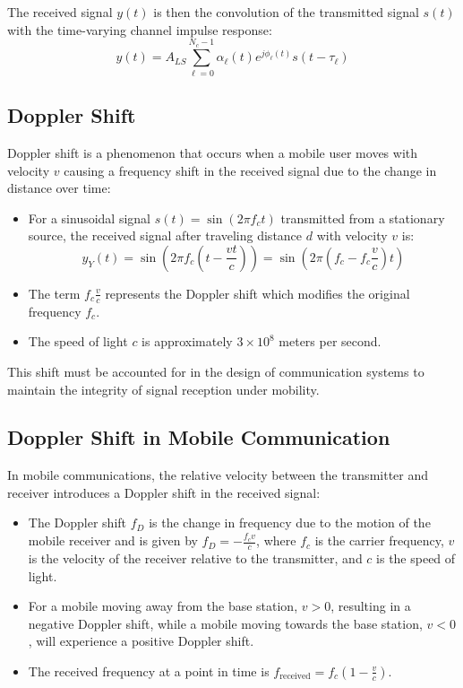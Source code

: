 The received signal \( y(t) \) is then the convolution of the transmitted signal \( s(t) \) with the time-varying channel impulse response:
\begin{equation}
    y(t) = A_{LS} \sum_{\ell=0}^{N_c-1} \alpha_{\ell}(t) e^{j\phi_{\ell}(t)} s(t - \tau_{\ell})
\end{equation}

\subsection*{Doppler Shift}

Doppler shift is a phenomenon that occurs when a mobile user moves with velocity \( v \) causing a frequency shift in the received signal due to the change in distance over time:

\begin{itemize}
    \item For a sinusoidal signal \( s(t) = \sin(2\pi f_c t) \) transmitted from a stationary source, the received signal after traveling distance \( d \) with velocity \( v \) is:
    \[
    y_Y(t) = \sin\left(2\pi f_c (t - \frac{v t}{c})\right) = \sin\left(2\pi (f_c - f_c \frac{v}{c})t\right)
    \]
    \item The term \( f_c \frac{v}{c} \) represents the Doppler shift which modifies the original frequency \( f_c \).
    \item The speed of light \( c \) is approximately \(3 \times 10^8\) meters per second.
\end{itemize}

This shift must be accounted for in the design of communication systems to maintain the integrity of signal reception under mobility.


\subsection*{Doppler Shift in Mobile Communication}

In mobile communications, the relative velocity between the transmitter and receiver introduces a Doppler shift in the received signal:

\begin{itemize}
    \item The Doppler shift \( f_D \) is the change in frequency due to the motion of the mobile receiver and is given by \( f_D = -\frac{f_cv}{c} \), where \( f_c \) is the carrier frequency, \( v \) is the velocity of the receiver relative to the transmitter, and \( c \) is the speed of light.
    \item For a mobile moving away from the base station, \( v > 0 \), resulting in a negative Doppler shift, while a mobile moving towards the base station, \( v < 0 \), will experience a positive Doppler shift.
    \item The received frequency at a point in time is \( f_{\text{received}} = f_c (1 - \frac{v}{c}) \).
\end{itemize}

